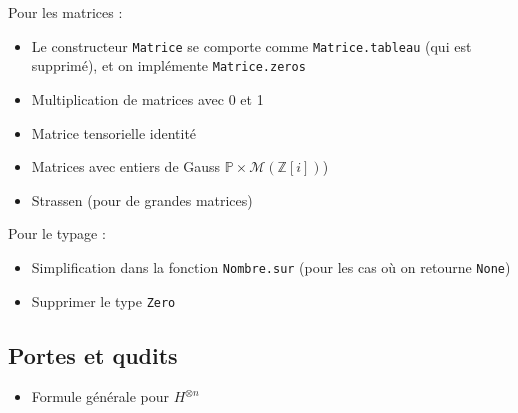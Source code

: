 \documentclass[french]{article}
\begin{document}
\noindent Pour les matrices :
\begin{itemize}
    \item Le constructeur \texttt{Matrice} se comporte comme \texttt{Matrice.tableau} (qui est supprimé), et on implémente \texttt{Matrice.zeros}
    \item Multiplication de matrices avec 0 et 1
    \item Matrice tensorielle identité
    \item Matrices avec entiers de Gauss $\mathbb{P} \times \mathcal{M}(\mathbb{Z}[i])$)
    \item Strassen (pour de grandes matrices)
\end{itemize}

\noindent Pour le typage :
\begin{itemize}
    \item Simplification dans la fonction \texttt{Nombre.sur} (pour les cas où on retourne \texttt{None})
    \item Supprimer le type \texttt{Zero}
\end{itemize}

\subsection{Portes et qudits}

\begin{itemize}
    \item Formule générale pour $H^{\otimes n}$
\end{itemize}
\end{document}
